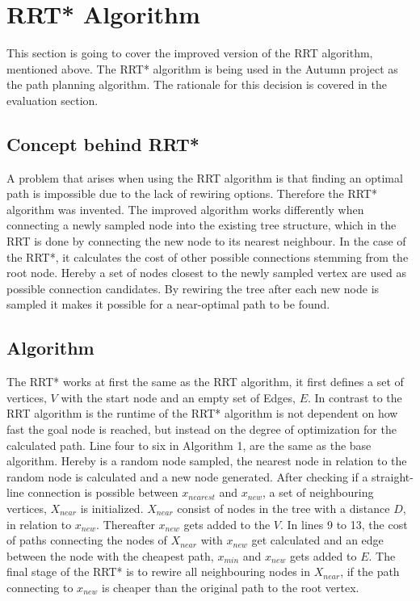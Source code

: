 \section{RRT* Algorithm}

This section is going to cover the improved version of the RRT algorithm, mentioned above. The RRT* algorithm is being used in the Autumn project as the path planning algorithm. The rationale for this decision is covered in the evaluation section. 

\subsection{Concept behind RRT*}

A problem that arises when using the RRT algorithm is that finding an optimal path is impossible due to the lack of rewiring options. Therefore the RRT* algorithm was invented. 
The improved algorithm works differently when connecting a newly sampled node into the existing tree structure, which in the RRT is done by connecting the new node to its nearest neighbour. In the case of the RRT*, it calculates the cost of other possible connections stemming from the root node. Hereby a set of nodes closest to the newly sampled vertex are used as possible connection candidates. By rewiring the tree after each new node is sampled it makes it possible for a near-optimal path to be found.

\subsection{Algorithm}

The RRT* works at first the same as the RRT algorithm, it first defines a set of vertices, $V$ with the start node and an empty set of Edges, $E$. In contrast to the RRT algorithm is the runtime of the RRT* algorithm is not dependent on how fast the goal node is reached, but instead on the degree of optimization for the calculated path.
Line four to six in Algorithm 1, are the same as the base algorithm. Hereby is a random node sampled, the nearest node in relation to the random node is calculated and a new node generated. After checking if a straight-line connection is possible between $x_{nearest}$ and $x_{new}$, a set of neighbouring vertices, $X_{near}$ is initialized.
$X_{near}$ consist of nodes in the tree with a distance $D$, in relation to $x_{new}$. Thereafter $x_{new}$ gets added to the $V$. In lines 9 to 13, the cost of paths connecting the nodes of $X_{near}$ with $x_{new}$ get calculated and an edge between the node with the cheapest path, $x_{min}$ and $x_{new}$ gets added to $E$. The final stage of the RRT* is to rewire all neighbouring nodes in $X_{near}$, if the path connecting to $x_{new}$ is cheaper than the original path to the root vertex. 


